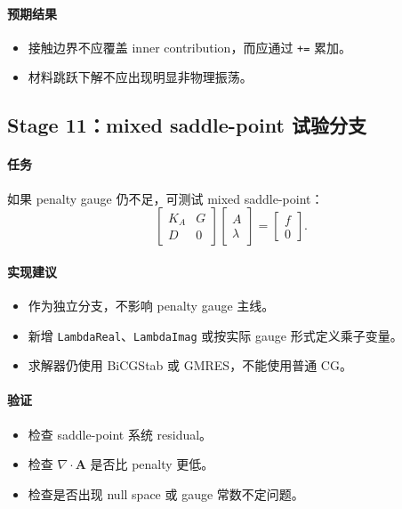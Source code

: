 \documentclass[UTF8,a4paper,11pt]{ctexart}
\newcommand{\code}[1]{\texttt{#1}}
\begin{document}
\paragraph{预期结果}
\begin{itemize}
  \item 接触边界不应覆盖 inner contribution，而应通过 \code{+=} 累加。
  \item 材料跳跃下解不应出现明显非物理振荡。
\end{itemize}

\subsection{Stage 11：mixed saddle-point 试验分支}

\paragraph{任务}
如果 penalty gauge 仍不足，可测试 mixed saddle-point：
\begin{equation}
\begin{bmatrix}
K_A & G\\
D & 0
\end{bmatrix}
\begin{bmatrix}
A\\
\lambda
\end{bmatrix}
=
\begin{bmatrix}
f\\
0
\end{bmatrix}.
\end{equation}

\paragraph{实现建议}
\begin{itemize}
  \item 作为独立分支，不影响 penalty gauge 主线。
  \item 新增 \code{LambdaReal}、\code{LambdaImag} 或按实际 gauge 形式定义乘子变量。
  \item 求解器仍使用 BiCGStab 或 GMRES，不能使用普通 CG。
\end{itemize}

\paragraph{验证}
\begin{itemize}
  \item 检查 saddle-point 系统 residual。
  \item 检查 $\nabla\cdot\bm A$ 是否比 penalty 更低。
  \item 检查是否出现 null space 或 gauge 常数不定问题。
\end{itemize}
\end{document}
